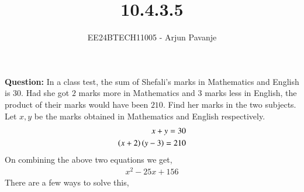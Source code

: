 \documentclass[journal]{IEEEtran}
\begin{document}

\vspace{3cm}

\title{10.4.3.5}
\author{EE24BTECH11005 - Arjun Pavanje}
{\let\newpage\relax\maketitle}
\textbf{Question:}
In a class test, the sum of Shefali's marks in Mathematics and English is $30$. Had she got $2$ marks more in Mathematics and $3$ marks less in English, the product of their marks would have been $210$. Find her marks in the two subjects. \newline
\solution \newline
Let $x, y$ be the marks obtained in Mathematics and English respectively. 
\begin{align}
  x + y = 30\\
  \left(x+2\right)\left(y-3\right) = 210
\end{align}
On combining the above two equations we get,
\begin{align}
  x^2 - 25x + 156
\end{align}
There are a few ways to solve this, \newline
\end{document}
